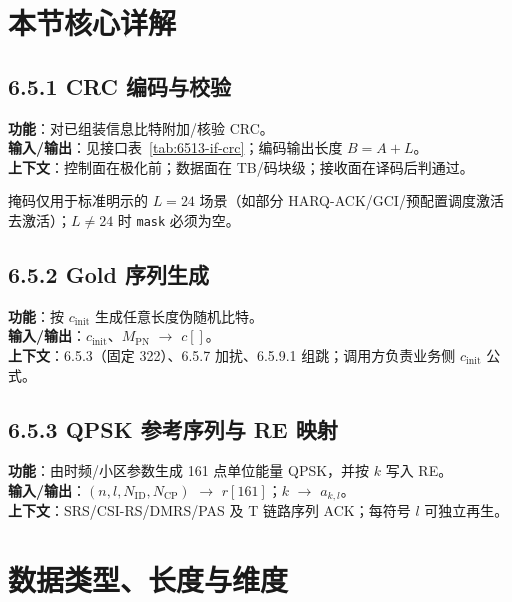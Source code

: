 \documentclass[11pt,a4paper]{ctexart}
\begin{document}
\section{本节核心详解}

\subsection{6.5.1 CRC 编码与校验}

\textbf{功能}：对已组装信息比特附加/核验 CRC。\\
\textbf{输入/输出}：见接口表~\ref{tab:6513-if-crc}；编码输出长度 $B{=}A{+}L$。\\
\textbf{上下文}：控制面在极化前；数据面在 TB/码块级；接收面在译码后判通过。

掩码仅用于标准明示的 $L{=}24$ 场景（如部分 HARQ-ACK/GCI/预配置调度激活去激活）；$L{\neq}24$ 时 \texttt{mask} 必须为空。

\subsection{6.5.2 Gold 序列生成}

\textbf{功能}：按 $c_{\mathrm{init}}$ 生成任意长度伪随机比特。\\
\textbf{输入/输出}：$c_{\mathrm{init}}$、$M_{\mathrm{PN}}$ $\rightarrow$ $c[]$。\\
\textbf{上下文}：6.5.3（固定 322）、6.5.7 加扰、6.5.9.1 组跳；调用方负责业务侧 $c_{\mathrm{init}}$ 公式。

\subsection{6.5.3 QPSK 参考序列与 RE 映射}

\textbf{功能}：由时频/小区参数生成 161 点单位能量 QPSK，并按 $k$ 写入 RE。\\
\textbf{输入/输出}：$(n,l,N_{\mathrm{ID}},N_{\mathrm{CP}})$ $\rightarrow$ $r[161]$；$k$ $\rightarrow$ $a_{k,l}$。\\
\textbf{上下文}：SRS/CSI-RS/DMRS/PAS 及 T 链路序列 ACK；每符号 $l$ 可独立再生。

\section{数据类型、长度与维度}
\end{document}
